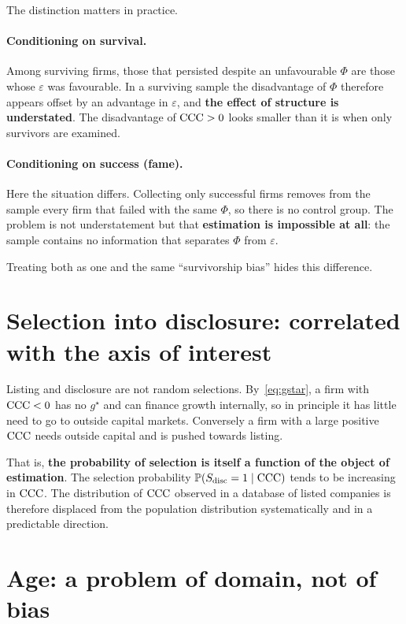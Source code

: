 The distinction matters in practice.

\paragraph{Conditioning on survival.}
Among surviving firms, those that persisted despite an unfavourable $\Phi$ are those whose
$\varepsilon$ was favourable. In a surviving sample the disadvantage of $\Phi$ therefore
appears offset by an advantage in $\varepsilon$, and \textbf{the effect of structure is
understated}. The disadvantage of $\mathrm{CCC}>0$ looks smaller than it is when only survivors are
examined.

\paragraph{Conditioning on success (fame).}
Here the situation differs. Collecting only successful firms removes from the sample every
firm that failed with the same $\Phi$, so there is no control group. The problem is not
understatement but that \textbf{estimation is impossible at all}: the sample contains no
information that separates $\Phi$ from $\varepsilon$.

Treating both as one and the same ``survivorship bias'' hides this difference.

\section{Selection into disclosure: correlated with the axis of interest}
\label{sec:disclosure}

Listing and disclosure are not random selections. By~\eqref{eq:gstar}, a firm with $\mathrm{CCC}<0$
has no $g^\star$ and can finance growth internally, so in principle it has little need to go
to outside capital markets. Conversely a firm with a large positive $\mathrm{CCC}$ needs outside
capital and is pushed towards listing.

That is, \textbf{the probability of selection is itself a function of the object of
estimation}. The selection probability $\mathbb{P}(S_{\mathrm{disc}}=1 \mid \mathrm{CCC})$ tends to be
increasing in $\mathrm{CCC}$. The distribution of $\mathrm{CCC}$ observed in a database of listed companies
is therefore displaced from the population distribution systematically and in a predictable
direction.

\section{Age: a problem of domain, not of bias}
\label{sec:age}

